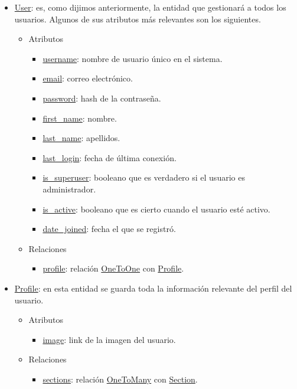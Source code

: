 \begin{itemize}
    \item \underline{User}: es, como dijimos anteriormente, la entidad que gestionará a todos los usuarios. Algunos de sus atributos más relevantes son los siguientes.
    \begin{itemize}
        \item Atributos
        \begin{itemize}
            \item \underline{username}: nombre de usuario único en el sistema.
            \item \underline{email}: correo electrónico.
            \item \underline{password}: hash de la contraseña.
            \item \underline{first\_name}: nombre.
            \item \underline{last\_name}: apellidos.
            \item \underline{last\_login}: fecha de última conexión.
            \item \underline{is\_superuser}: booleano que es verdadero si el usuario es administrador.
            \item \underline{is\_active}: booleano que es cierto cuando el usuario esté activo.
            \item \underline{date\_joined}: fecha el que se registró.
        \end{itemize}
        \item Relaciones
        \begin{itemize}
            \item \underline{profile}: relación \underline{OneToOne} con \underline{Profile}.
        \end{itemize}
    \end{itemize}
    \item \underline{Profile}: en esta entidad se guarda toda la información relevante del perfil del usuario.
    \begin{itemize}
        \item Atributos
        \begin{itemize}
            \item \underline{image}: link de la imagen del usuario.
        \end{itemize}
        \item Relaciones
        \begin{itemize}
            \item \underline{sections}: relación \underline{OneToMany} con \underline{Section}.

\end{itemize}
\end{itemize}
\end{itemize}
